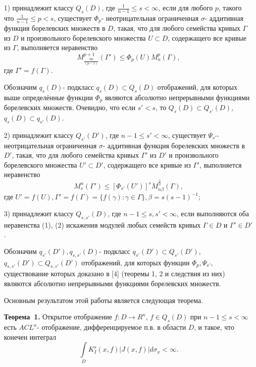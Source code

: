     1) принадлежит классу $Q_{s}(D)$, где $\frac{1}{n-1}\leqslant s<\infty$, если для любого $p$, такого что $\frac{1}{n-1}\leqslant p<s$, существует $\Phi_{p}$- неотрицательная ограниченная $\sigma$- аддитивная функция борелевских множеств в $D$, такая, что для любого семейства кривых $\Gamma$ из $D$ и произвольного борелевского множества $U\subset D$, содержащего все кривые из $\Gamma$, выполняется неравенство
 \begin{equation}\label{eq-1}
 	M_{\frac{np}{(p-1)}}^{p+1}(\Gamma')\leqslant\Phi_{p}(U)M^{p}_{n}(\Gamma),
 \end{equation}
где $\Gamma'=f(\Gamma)$.

Обозначим $q_{s}(D)$- подкласс $q_{s}(D)\subset Q_{s}(D)$ отображений, для которых выше определённые функции $\Phi_{p}$ являются абсолютно непрерывными функциями борелевских множеств. Очевидно, что если $s'<s$, то $Q_{s}(D)\subset Q_{s'}(D)$, $q_{s}(D)\subset q_{s'}(D)$.

2) принадлежит классу $Q_{s'}(D')$, где $n-1\leqslant s'<\infty$, существует $\Psi_{s'}$- неотрицательная ограниченная $\sigma$- аддитивная функция борелевских множеств в $D'$, такая, что для любого семейства кривых $\Gamma'$ из $D'$ и произвольного борелевского множества $U'\subset D'$, содержащего все кривые из $\Gamma'$, выполняется неравенство
\begin{equation}\label{eq-2}
M_{s}^{n}(\Gamma')\leqslant[\Phi_{s'}(U')]^{s}M^{\frac{s}{\beta}}_{n\beta}(\Gamma),
\end{equation}
где $U'=f(U),\Gamma'=f(\Gamma)=\{f(\gamma):\gamma\in\Gamma\},\beta=s(s-1)^{-1}$;

3) принадлежит классу $Q_{s,s'}(D)$, где $n-1\leqslant s,s'<\infty$, если выполняются оба неравенства (1), (2) искажения модулей любых семейств кривых $\Gamma\in D$ и $\Gamma'\in D'$.

Обозначим $q_{s'}(D'),q_{s,s'}(D)$- подкласс $q_{s'}(D')\subset Q_{s'}(D')$, $q_{s,s'}(D')\subset Q_{s,s'}(D')$ отображений, для которых функции $\Phi_{p},\Psi_{s'}$, существование которых доказано в [4] (теоремы 1, 2 и следствия из них) являются абсолютно непрерывными функциями борелевских множеств.

Основным результатом этой работы является следующая теорема.


\textbf{Теорема~1.} Открытое отображение $f:D\rightarrow R^{n}$, $f\in Q_{s}(D)$ при $n-1\leqslant s<\infty$ есть $ACL^{n}$- отображение, дифференцируемое п.в. в области $D$, и такое, что конечен интеграл
\begin{equation*}
\int\limits_{D}K^{s}_{I}(x,f)|J(x,f)|d\sigma_{x}<\infty.
\end{equation*}


